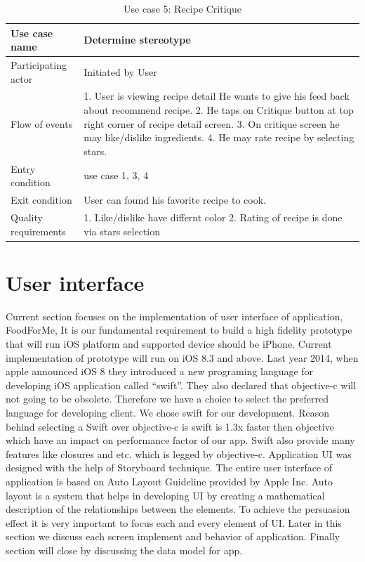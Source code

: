    
    \begin{table}[ht]
    	\centering %
    	\begin{tabular}{p{4cm} p{10cm}}  %
    		\hline\hline %
    		Use case name & Determine stereotype \\ %
    		\hline %
    		
    		Participating actor & Initiated by User \\ %
    		Flow of events & 1. User is viewing recipe detail 
			He wants to give his feed back about recommend recipe. 
			2. He taps on Critique button at top right corner of recipe detail screen. 
			3. On critique screen he may like/dislike ingredients. 
			4. He may rate recipe by selecting stars.\\
    		Entry condition & use case 1, 3, 4\\
    		Exit condition & User can found his favorite recipe to cook.\\
    		Quality requirements & 1. Like/dislike have differnt color 2. Rating of recipe is done via stars selection\\ [1ex] %
    		\hline %
    	\end{tabular}
    	\caption{Use case 5: Recipe Critique}
    	\label{table:recipe_ingredient_critique}
    \end{table}
    
    
\section{User interface}    

Current section focuses on the implementation of user interface of application, FoodForMe, It is our fundamental requirement to build a high fidelity prototype that will run iOS platform and supported device should be iPhone. Current implementation of prototype will run on iOS 8.3 and above. Last year 2014, when apple announced iOS 8 they introduced a new programing language for developing iOS application called “swift”. They also declared that objective-c will not going to be obsolete. Therefore we have a choice to select the preferred language for developing client. We chose swift for our development. Reason behind selecting a Swift over objective-c is swift is 1.3x faster then objective which have an impact on performance factor of our app. Swift also provide many features like closures and etc. which is legged by objective-c.  Application UI was designed with the help of Storyboard technique.  The entire user interface of application is based on Auto Layout Guideline provided by Apple Inc. Auto layout is a system that helps in developing UI by creating a mathematical description of the relationships between the elements. To achieve the persuasion effect it is very important to focus each and every element of UI. Later in this section we discuss each screen implement and behavior of application. Finally section will close by discussing the data model for app.

